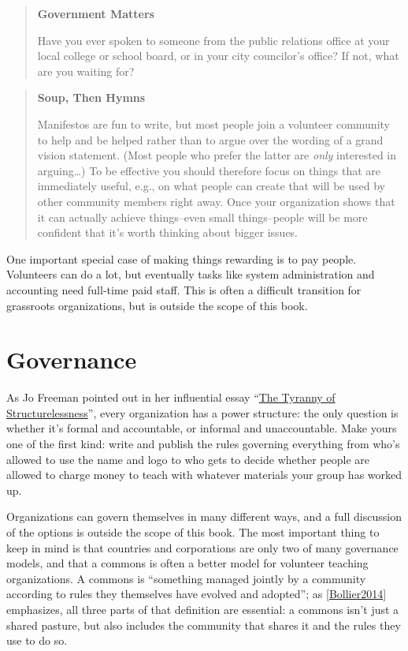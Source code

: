 \documentclass[10pt,statementpaper]{memoir}
\begin{document}
\begin{quote}
\textbf{Government Matters}

Have you ever spoken to someone from the public relations office at your
local college or school board, or in your city councilor's office? If
not, what are you waiting for?
\end{quote}

\begin{quote}
\textbf{Soup, Then Hymns}

Manifestos are fun to write, but most people join a volunteer community
to help and be helped rather than to argue over the wording of a grand
vision statement. (Most people who prefer the latter are \emph{only}
interested in arguing\ldots{}) To be effective you should therefore
focus on things that are immediately useful, e.g., on what people can
create that will be used by other community members right away. Once
your organization shows that it can actually achieve things--even small
things--people will be more confident that it's worth thinking about
bigger issues.
\end{quote}

One important special case of making things rewarding is to pay people.
Volunteers can do a lot, but eventually tasks like system administration
and accounting need full-time paid staff. This is often a difficult
transition for grassroots organizations, but is outside the scope of
this book.

\section{Governance}\label{governance}

As Jo Freeman pointed out in her influential essay
``\href{http://www.jofreeman.com/joreen/tyranny.htm}{The Tyranny of
Structurelessness}'', every organization has a power structure: the only
question is whether it's formal and accountable, or informal and
unaccountable. Make yours one of the first kind: write and publish the
rules governing everything from who's allowed to use the name and logo
to who gets to decide whether people are allowed to charge money to
teach with whatever materials your group has worked up.

Organizations can govern themselves in many different ways, and a full
discussion of the options is outside the scope of this book. The most
important thing to keep in mind is that countries and corporations are
only two of many governance models, and that a commons is often a better
model for volunteer teaching organizations. A commons is ``something
managed jointly by a community according to rules they themselves have
evolved and adopted''; as
{[}\href{biblio.html\#bollier-commoner}{Bollier2014}{]} emphasizes, all
three parts of that definition are essential: a commons isn't just a
shared pasture, but also includes the community that shares it and the
rules they use to do so.
\end{document}
